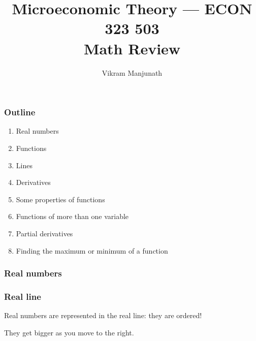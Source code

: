 \documentclass[xcolor=pdftex,dvipsnames]{beamer}
\title{Microeconomic Theory --- ECON 323 503 \\ Math Review}
\author{Vikram Manjunath}
\institute{Texas A\&M University}
\begin{document}
\maketitle

\begin{frame}
\frametitle{Outline}
\begin{enumerate}
\item Real numbers
\item Functions 
\item Lines
\item Derivatives
\item Some properties of functions
\item Functions of more than one variable
\item Partial derivatives
\item Finding the maximum or minimum of a function
\end{enumerate}

\end{frame}

\begin{frame}\frametitle{Real numbers}
\bigskip

\end{frame}

\begin{frame}\frametitle{Real line}
Real numbers are represented in the real line: they are ordered! 
\bigskip

{They get bigger as you move to the right.}

\bigskip
{}
\end{frame}
\end{document}

